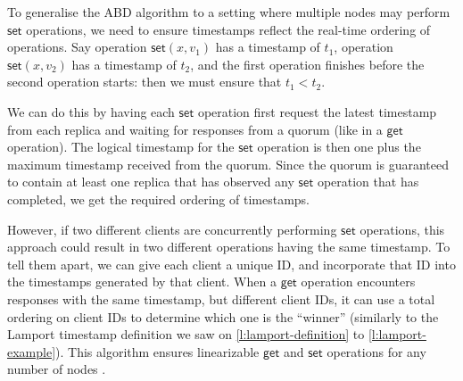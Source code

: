 To generalise the ABD algorithm to a setting where multiple nodes may perform $\mathsf{set}$ operations, we need to ensure timestamps reflect the real-time ordering of operations.
Say operation $\mathsf{set}(x, v_1)$ has a timestamp of $t_1$, operation $\mathsf{set}(x, v_2)$ has a timestamp of $t_2$, and the first operation finishes before the second operation starts: then we must ensure that $t_1 < t_2$.

We can do this by having each $\mathsf{set}$ operation first request the latest timestamp from each replica and waiting for responses from a quorum (like in a $\mathsf{get}$ operation).
The logical timestamp for the $\mathsf{set}$ operation is then one plus the maximum timestamp received from the quorum.
Since the quorum is guaranteed to contain at least one replica that has observed any $\mathsf{set}$ operation that has completed, we get the required ordering of timestamps.

However, if two different clients are concurrently performing $\mathsf{set}$ operations, this approach could result in two different operations having the same timestamp.
To tell them apart, we can give each client a unique ID, and incorporate that ID into the timestamps generated by that client.
When a $\mathsf{get}$ operation encounters responses with the same timestamp, but different client IDs, it can use a total ordering on client IDs to determine which one is the ``winner'' (similarly to the Lamport timestamp definition we saw on \autoref{l:lamport-definition} to \ref{l:lamport-example}).
This algorithm ensures linearizable $\mathsf{get}$ and $\mathsf{set}$ operations for any number of nodes \citep{Cachin:2011,Lynch:1997}.


